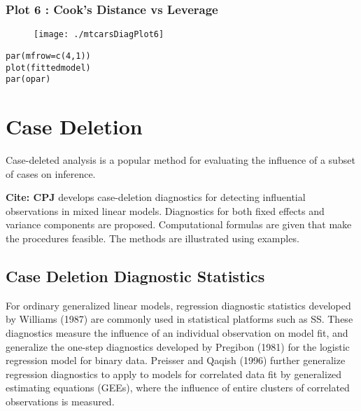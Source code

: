 \subsubsection{Plot 6 :  Cook's Distance vs Leverage}
\begin{figure}[h!]
\centering
\texttt{[image: ./mtcarsDiagPlot6]}

\label{mtcarsDiagPlot6}
\end{figure}


\begin{framed}
\begin{verbatim}
par(mfrow=c(4,1))
plot(fittedmodel)
par(opar)
\end{verbatim}
\end{framed}


\newpage
\section{Case Deletion} %
Case-deleted analysis is a popular method for evaluating the inﬂuence of a subset of cases on inference.

\textbf{Cite: CPJ} develops case-deletion diagnostics for detecting influential observations in mixed linear models. Diagnostics for both fixed effects and variance components are proposed. Computational formulas are given that make the procedures feasible. The methods are illustrated using examples. 

\subsection{Case Deletion Diagnostic Statistics}

For ordinary generalized linear models, regression diagnostic statistics developed by Williams (1987) are commonly used in statistical platforms such as SS. These diagnostics measure the influence of an individual observation on model fit, and generalize the one-step diagnostics developed by Pregibon (1981) for the logistic regression model for binary data.
Preisser and Qaqish (1996) further generalize regression diagnostics to apply to models for correlated data fit by generalized estimating equations (GEEs), where the influence of entire clusters of correlated observations is measured.


